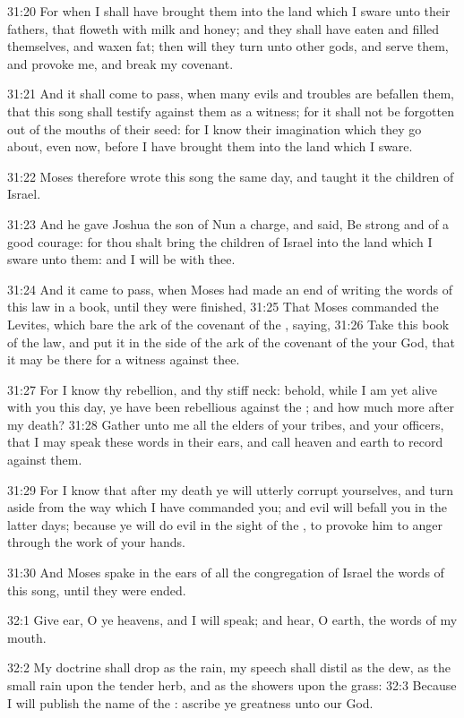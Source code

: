 31:20 For when I shall have brought them into the land which I sware unto their fathers, that floweth with milk and honey; and they shall have eaten and filled themselves, and waxen fat; then will they turn unto other gods, and serve them, and provoke me, and break my covenant.

31:21 And it shall come to pass, when many evils and troubles are befallen them, that this song shall testify against them as a witness; for it shall not be forgotten out of the mouths of their seed: for I know their imagination which they go about, even now, before I have brought them into the land which I sware.

31:22 Moses therefore wrote this song the same day, and taught it the children of Israel.

31:23 And he gave Joshua the son of Nun a charge, and said, Be strong and of a good courage: for thou shalt bring the children of Israel into the land which I sware unto them: and I will be with thee.

31:24 And it came to pass, when Moses had made an end of writing the words of this law in a book, until they were finished, 31:25 That Moses commanded the Levites, which bare the ark of the covenant of the \LORD, saying, 31:26 Take this book of the law, and put it in the side of the ark of the covenant of the \LORD your God, that it may be there for a witness against thee.

31:27 For I know thy rebellion, and thy stiff neck: behold, while I am yet alive with you this day, ye have been rebellious against the \LORD; and how much more after my death?  31:28 Gather unto me all the elders of your tribes, and your officers, that I may speak these words in their ears, and call heaven and earth to record against them.

31:29 For I know that after my death ye will utterly corrupt yourselves, and turn aside from the way which I have commanded you; and evil will befall you in the latter days; because ye will do evil in the sight of the \LORD, to provoke him to anger through the work of your hands.

31:30 And Moses spake in the ears of all the congregation of Israel the words of this song, until they were ended.

32:1 Give ear, O ye heavens, and I will speak; and hear, O earth, the words of my mouth.

32:2 My doctrine shall drop as the rain, my speech shall distil as the dew, as the small rain upon the tender herb, and as the showers upon the grass: 32:3 Because I will publish the name of the \LORD: ascribe ye greatness unto our God.

